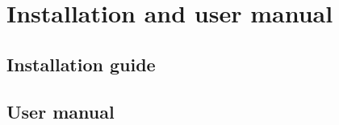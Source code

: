 \chapter{Installation and user manual}

\section{Installation guide}

\section{User manual}

\clearpage